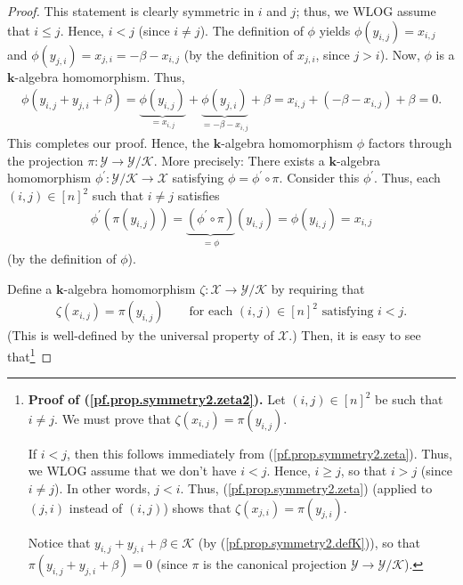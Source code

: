 \documentclass[pdftex]{sigma}
\numberwithin{equation}{section}
\begin{document}
\begin{proof}
{This statement is clearly symmetric in $i$ and $j$; thus, we WLOG assume that $i\leq j$. Hence, $i<j$ (since $i\neq j$). The definition of $\phi$ yields $\phi ( y_{i,j} ) =x_{i,j}$ and $\phi ( y_{j,i} ) =x_{j,i}=-\beta-x_{i,j}$ (by the definition of $x_{j,i}$, since $j>i$). Now, $\phi$ is a $\mathbf{k}$-algebra homomorphism. Thus,
\begin{gather*}
\phi ( y_{i,j}+y_{j,i}+\beta ) =\underbrace{\phi ( y_{i,j} ) }_{=x_{i,j}}+\underbrace{\phi ( y_{j,i} ) }_{=-\beta-x_{i,j}}+\beta=x_{i,j}+ ( -\beta-x_{i,j} ) +\beta=0.
\end{gather*}
This completes our proof.} Hence, the $\mathbf{k}$-algebra homomorphism $\phi$ factors through the projection $\pi\colon \mathcal{Y}\rightarrow \mathcal{Y}/\mathcal{K}$. More precisely: There exists a $\mathbf{k}$-algebra
homomorphism $\phi^{\prime}\colon \mathcal{Y}/\mathcal{K}\rightarrow\mathcal{X}$ satisfying $\phi=\phi^{\prime}\circ\pi$. Consider this $\phi^{\prime}$. Thus, each $(i,j) \in[n] ^{2}$ such that $i\neq j$ satisfies
\begin{gather}
\phi^{\prime} ( \pi(y_{i,j}) ) =\underbrace{(\phi^{\prime}\circ\pi) }_{=\phi}(y_{i,j}) =\phi(y_{i,j}) =x_{i,j} \label{pf.prop.symmetry2.phi'}
\end{gather}
(by the definition of $\phi$).

Define a $\mathbf{k}$-algebra homomorphism $\zeta\colon \mathcal{X}\rightarrow \mathcal{Y}/\mathcal{K}$ by requiring that
\begin{gather}
\zeta(x_{i,j}) =\pi(y_{i,j}) \qquad \text{for each }(i,j) \in[n]^{2}\text{ satisfying }i<j. \label{pf.prop.symmetry2.zeta}
\end{gather}
(This is well-defined by the universal property of $\mathcal{X}$.) Then, it is easy to see that\footnote{\textbf{Proof of (\ref{pf.prop.symmetry2.zeta2}).} Let $(i,j) \in[n] ^{2}$ be such that $i\neq j$. We must prove
that $\zeta(x_{i,j}) =\pi(y_{i,j}) $.

If $i<j$, then this follows immediately from (\ref{pf.prop.symmetry2.zeta}). Thus, we WLOG assume that we don't have $i<j$. Hence, $i\geq j$, so that $i>j$ (since $i\neq j$). In other words, $j<i$. Thus, (\ref{pf.prop.symmetry2.zeta}) (applied to $( j,i) $ instead of $(i,j) $) shows that $\zeta(x_{j,i}) =\pi(y_{j,i}) $.

Notice that $y_{i,j}+y_{j,i}+\beta\in\mathcal{K}$ (by (\ref{pf.prop.symmetry2.defK})), so that $\pi ( y_{i,j}+y_{j,i}+\beta ) =0$ (since $\pi$ is the canonical projection $\mathcal{Y}\rightarrow\mathcal{Y}/\mathcal{K}$).

}
\end{proof}
\end{document}
